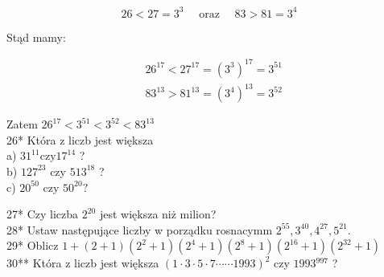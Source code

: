 \documentclass[10pt]{article}
\begin{document}
\[
26<27=3^{3} \quad \text { oraz } \quad 83>81=3^{4}
\]

Stąd mamy:

\[
\begin{aligned}
& 26^{17}<27^{17}=\left(3^{3}\right)^{17}=3^{51} \\
& 83^{13}>81^{13}=\left(3^{4}\right)^{13}=3^{52}
\end{aligned}
\]

Zatem \(26^{17}<3^{51}<3^{52}<83^{13}\)\\
26* Która z liczb jest większa\\
a) \(31^{11} \mathrm{czy} 17^{14}\) ?\\
b) \(127^{23}\) czy \(513^{18}\) ?\\
c) \(20^{50}\) czy \(50^{20} ?\)

27* Czy liczba \(2^{20}\) jest większa niż milion?\\
28* Ustaw następujące liczby w porządku rosnacymm \(2^{55}, 3^{40}, 4^{27}, 5^{21}\).\\
29* Oblicz \(1+(2+1)\left(2^{2}+1\right)\left(2^{4}+1\right)\left(2^{8}+1\right)\left(2^{16}+1\right)\left(2^{32}+1\right)\)\\
30** Która z liczb jest większa \((1 \cdot 3 \cdot 5 \cdot 7 \cdots \cdots 1993)^{2}\) czy \(1993{ }^{997}\) ?
\end{document}
